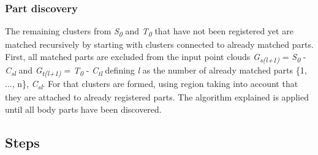 \subsubsection{Part discovery}

The remaining clusters from \textit{S\textsubscript{0}} and \textit{T\textsubscript{0}} that have not been registered yet are matched recursively by starting with clusters connected to already matched parts. First, all matched parts are excluded from the input point clouds  \textit{G\textsubscript{s(l+1)}} = \textit{S\textsubscript{0}} - \textit{C\textsubscript{sl}} and \textit{G\textsubscript{t(l+1)}} = \textit{T\textsubscript{0}} - \textit{C\textsubscript{tl}} defining \textit{l} as the number of already matched parts \{1, ..., n\}, \textit{C\textsubscript{sl}}. For that clusters are formed, using region taking into account that they are attached to already registered parts. The algorithm explained is applied until all body parts have been discovered.

\subsection{Steps}

